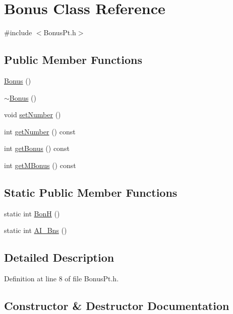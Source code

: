 \hypertarget{class_bonus}{}\section{Bonus Class Reference}
\label{class_bonus}


{\ttfamily \#include $<$Bonus\+Pt.\+h$>$}

\subsection*{Public Member Functions}
\begin{DoxyCompactItemize}
\item 
\hyperlink{class_bonus_a005571f0961a2e0f1af2befc35d804cf}{Bonus} ()
\item 
\hyperlink{class_bonus_ace96cd91925b1f65b2c8596930fed6f5}{$\sim$\+Bonus} ()
\item 
void \hyperlink{class_bonus_a9b49303ba2ac90ed51903d720c254d16}{set\+Number} ()
\item 
int \hyperlink{class_bonus_a8410340d40b2c2f94e6975da25715615}{get\+Number} () const 
\item 
int \hyperlink{class_bonus_a20eafd1e0dc632fbbd86d860822e95bf}{get\+Bonus} () const 
\item 
int \hyperlink{class_bonus_aaa4cc8b64910ad7fac1a0e2408a26338}{get\+M\+Bonus} () const 
\end{DoxyCompactItemize}
\subsection*{Static Public Member Functions}
\begin{DoxyCompactItemize}
\item 
static int \hyperlink{class_bonus_aad2515d0e2e8a4e0c6fcbbd01c167712}{Bon\+H} ()
\item 
static int \hyperlink{class_bonus_ae2f51b8407ff820aa8a0a180d2158554}{A\+I\+\_\+\+Bns} ()
\end{DoxyCompactItemize}


\subsection{Detailed Description}


Definition at line 8 of file Bonus\+Pt.\+h.



\subsection{Constructor \& Destructor Documentation}
\hypertarget{class_bonus_a005571f0961a2e0f1af2befc35d804cf}{}

